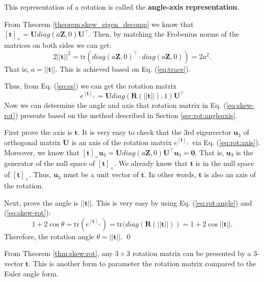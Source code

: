 \documentclass[12pt]{article}
\numberwithin{equation}{section}
\renewenvironment{proof}{{\bfseries Proof.}}{\qed \\}
\begin{document}
This representation of a rotation is called the \textbf{angle-axis representation}.

\begin{proof}
From Theorem \ref{theorem:skew_eigen_decomp} we know that $[\mathbf{t}]_{\times} = \mathbf{U} diag(a\mathbf{Z}, 0) \mathbf{U}^\top$. Then, by matching the Frobenius norms of the matrices on both sides we can get:
\begin{equation*}
2||\mathbf{t}||^2 = \text{tr}(diag(a\mathbf{Z}, 0)^\top \cdot diag(a\mathbf{Z}, 0)) = 2a^2.
\end{equation*}
%
That is, $a = ||\mathbf{t}||$. This is achieved based on Eq. (\ref{eq:trace}).

Thus, from Eq. (\ref{eq:es}) we can get the rotation matrix
\begin{equation}
e^{[\mathbf{t}]_{\times}} = \mathbf{U} diag(\mathbf{R}(||\mathbf{t}||), 1) \mathbf{U}^\top
\label{eq:skew-rot}
\end{equation}
Now we can determine the angle and axis that rotation matrix in Eq. (\ref{eq:skew-rot}) presents based on the method described in Section \ref{sec:rot:angleaxis}.

First prove the axis is $\mathbf{t}$. It is very easy to check that the 3rd eigenvector $\mathbf{u}_3$ of orthogonal matrix $\mathbf{U}$ is an axis of the rotation matrix $e^{[\mathbf{t}]_{\times}}$ via Eq. (\ref{eq:rot:axis}). Moreover, we know that $[\mathbf{t}]_{\times}\mathbf{u}_3 = \mathbf{U} diag(a\mathbf{Z}, 0) \mathbf{U}^\top \mathbf{u}_3 = \mathbf{0}$. That is, $\mathbf{u}_3$ is the generator of the null space of $[\mathbf{t}]_{\times}$.  We already know that $\mathbf{t}$ is in the null space of $[\mathbf{t}]_{\times}$. Thus, $\mathbf{u}_3$ must be a unit vector of $\mathbf{t}$. In other words, $\mathbf{t}$ is also an axis of the rotation.

Next, prove the angle is $||\mathbf{t}||$. This is very easy by using Eq. (\ref{eq:rot:angle}) and (\ref{eq:skew-rot}):
\begin{equation}
1 + 2\cos\theta = \text{tr}(e^{[\mathbf{t}]_{\times}}) = \text{tr}(diag(\mathbf{R}(||\mathbf{t}||)) = 1 + 2\cos||\mathbf{t}||.
\end{equation}
Therefore, the rotation angle $\theta = ||\mathbf{t}||$.
\end{proof}

From Theorem \ref{thm:skew:rot}, any $3 \times 3$ rotation matrix can be presented by a 3-vector $\mathbf{t}$. This is another form to parameter the rotation matrix compared to the Euler angle form.
\end{document}

